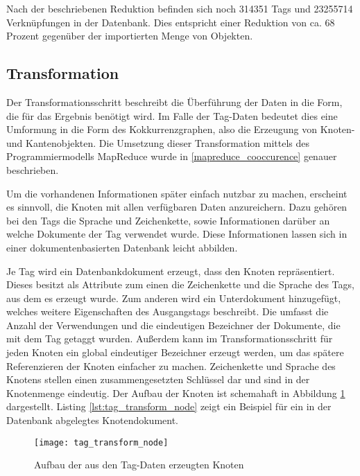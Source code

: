 Nach der beschriebenen Reduktion befinden sich noch \num{314351} Tags und \num{23255714} Verknüpfungen in der Datenbank. Dies entspricht einer Reduktion von ca. \num{68} Prozent gegenüber der importierten Menge von Objekten.

\subsection{Transformation}

Der Transformationsschritt beschreibt die Überführung der Daten in die Form, die für das Ergebnis benötigt wird. Im Falle der Tag-Daten bedeutet dies eine Umformung in die Form des Kokkurrenzgraphen, also die Erzeugung von Knoten- und Kantenobjekten. Die Umsetzung dieser Transformation mittels des Programmiermodells MapReduce wurde in \ref{mapreduce_cooccurence} genauer beschrieben.

Um die vorhandenen Informationen später einfach nutzbar zu machen, erscheint es sinnvoll, die Knoten mit allen verfügbaren Daten anzureichern. Dazu gehören bei den Tags die Sprache und Zeichenkette, sowie Informationen darüber an welche Dokumente der Tag verwendet wurde. Diese Informationen lassen sich in einer dokumentenbasierten Datenbank leicht abbilden.

Je Tag wird ein Datenbankdokument erzeugt, dass den Knoten repräsentiert. Dieses besitzt als Attribute zum einen die Zeichenkette und die Sprache des Tags, aus dem es erzeugt wurde. Zum anderen wird ein Unterdokument hinzugefügt, welches weitere Eigenschaften des Ausgangstags beschreibt. Die umfasst die Anzahl der Verwendungen und die eindeutigen Bezeichner der Dokumente, die mit dem Tag getaggt wurden. Außerdem kann im Transformationsschritt für jeden Knoten ein global eindeutiger Bezeichner erzeugt werden, um das spätere Referenzieren der Knoten einfacher zu machen. Zeichenkette und Sprache des Knotens stellen einen zusammengesetzten Schlüssel dar und sind in der Knotenmenge eindeutig. Der Aufbau der Knoten ist schemahaft in Abbildung \ref{fig:tag_transform_node} dargestellt. Listing \ref{lst:tag_transform_node} zeigt ein Beispiel für ein in der Datenbank abgelegtes Knotendokument.

\begin{figure}
\begin{center}
    \texttt{[image: tag\_transform\_node]}
\end{center}
\caption{Aufbau der aus den Tag-Daten erzeugten Knoten}
\label{fig:tag_transform_node}
\end{figure}

